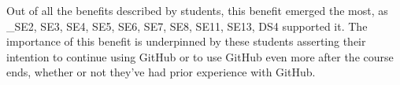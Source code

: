 Out of all the benefits described by students, this benefit emerged the most, as _{SE2, SE3, SE4, SE5, SE6, SE7, SE8, SE11, SE13, DS4} supported it. The importance of this benefit is underpinned by these students asserting their intention to continue using GitHub or to use GitHub even more after the course ends, whether or not they've had prior experience with GitHub.





